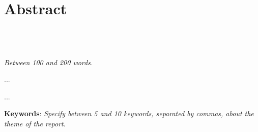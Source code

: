 \chapter{Abstract}
\section*{\textit{\TITLE}\\  {\small{\textit{\SUBTITLE}}}}

\textit{Between 100 and 200 words.}

...

...



\textbf{Keywords}: \textit{Specify between 5 and 10 keywords, separated by commas, about the theme of the report}.